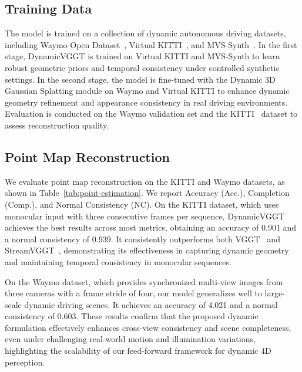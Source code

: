 \subsection{Training Data}
The model is trained on a collection of dynamic autonomous driving datasets, including Waymo Open Dataset~\cite{waymo}, Virtual KITTI~\cite{virtualkitti}, and MVS-Synth~\cite{mvssynth}.
In the first stage, DynamicVGGT is trained on Virtual KITTI and MVS-Synth to learn robust geometric priors and temporal consistency under controlled synthetic settings.
In the second stage, the model is fine-tuned with the Dynamic 3D Gaussian Splatting module on Waymo and Virtual KITTI to enhance dynamic geometry refinement and appearance consistency in real driving environments.
Evaluation is conducted on the Waymo validation set and the KITTI~\cite{kitti17} dataset to assess reconstruction quality.

\subsection{Point Map Reconstruction}
We evaluate point map reconstruction on the KITTI and Waymo datasets, as shown in Table~\ref{tab:point-estimation}.
We report Accuracy (Acc.), Completion (Comp.), and Normal Consistency (NC). On the KITTI dataset, which uses monocular input with three consecutive frames per sequence, DynamicVGGT achieves the best results across most metrics, obtaining an accuracy of 0.901 and a normal consistency of 0.939.
It consistently outperforms both VGGT~\cite{wang2025vggt} and StreamVGGT~\cite{zhuo2025streaming}, demonstrating its effectiveness in capturing dynamic geometry and maintaining temporal consistency in monocular sequences.

On the Waymo dataset, which provides synchronized multi-view images from three cameras with a frame stride of four, our model generalizes well to large-scale dynamic driving scenes.
It achieves an accuracy of 4.021 and a normal consistency of 0.603.
These results confirm that the proposed dynamic formulation effectively enhances cross-view consistency and scene completeness, even under challenging real-world motion and illumination variations, highlighting the scalability of our feed-forward framework for dynamic 4D perception.



